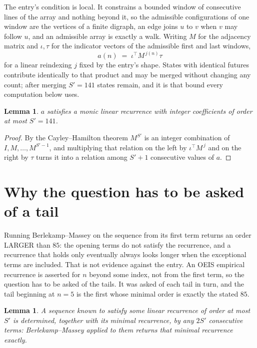 \documentclass[11pt,a4paper]{article}
\theoremstyle{plain}
\newtheorem{lemma}[theorem]{Lemma}
\theoremstyle{definition}
\begin{document}
The entry's condition is local. It constrains a bounded window of consecutive lines of the
array and nothing beyond it, so the admissible configurations of one window are the vertices of
a finite digraph, an edge joins $u$ to $v$ when $v$ may follow $u$, and an admissible array is
exactly a walk. Writing $M$ for the adjacency matrix and $\iota,\tau$ for the indicator vectors
of the admissible first and last windows,
\[
a(n)\;=\;\iota^{\!\top}M^{\,j(n)}\tau
\]
for a linear reindexing $j$ fixed by the entry's shape. States with identical futures
contribute identically to that product and may be merged without changing any count; after
merging $S'=141$ states remain, and it is that bound every computation below uses.

\begin{lemma}\label{lem:cf}
$a$ satisfies a monic linear recurrence with integer coefficients of order at most $S'=141$.
\end{lemma}

\begin{proof}
By the Cayley--Hamilton theorem $M^{S'}$ is an integer combination of $I,M,\dots,M^{S'-1}$,
and multiplying that relation on the left by $\iota^{\!\top}M^{\,j}$ and on the right by
$\tau$ turns it into a relation among $S'+1$ consecutive values of $a$.
\end{proof}

\section{Why the question has to be asked of a tail}

Running Berlekamp--Massey on the sequence from its first term returns an order LARGER than $85$: the opening terms do not satisfy the recurrence, and a recurrence that holds only eventually always looks longer when the exceptional terms are included. That is not evidence against the entry. An OEIS empirical recurrence is asserted for $n$ beyond some index, not from the first term, so the question has to be asked of the tails. It was asked of each tail in turn, and the tail beginning at $n=5$ is the first whose minimal order is exactly the stated $85$.

\begin{lemma}\label{lem:bm}
A sequence known to satisfy some linear recurrence of order at most $S'$ is determined,
together with its minimal recurrence, by any $2S'$ consecutive terms: Berlekamp--Massey applied
to them returns that minimal recurrence exactly.
\end{lemma}
\end{document}
